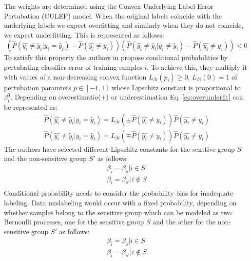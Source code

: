 \documentclass[runningheads]{llncs}
\begin{document}
The weights are determined using the Convex Underlying Label Error Pertubation (CULEP) model. When the original labels coincide with the underlying labels we expect overfitting and similarly when they do not coincide, we expect underfitting. This is represented as follows:
\begin{equation}
(\hat{P}(\hat{y_i} \neq \tilde{y_i} | y_i = \tilde{y_i})-\hat{P}(\hat{y_i} \neq y_i))(\hat{P}(\hat{y_i} \neq \tilde{y_i} | y_i \neq \tilde{y_i})-\hat{P}(\hat{y_i} \neq y_i)) < 0
\label{eq:overunderfit}
\end{equation}
To satisfy this property the authors in \cite{krasanakis2018adaptive} propose conditional probabilities by pertubating classifier error of training samples $i$. To achieve this, they multiply it with values of a non-decreasing convex function $L_{\beta i}(p_i) \geq 0$, $L_{\beta i}(0) = 1$ of pertubation paramters $p \in [-1,1]$ whose Lipschitz constant is proportional to $\beta_i^3$. Depending on overestimatio(+) or underestimation Eq. \ref{eq:overunderfit} can be represented as:
\begin{equation}
\begin{split}
\hat{P}(\hat{y_i} \neq \tilde{y_i} | y_i = \tilde{y_i}) = L_{\beta i}(\pm \hat{P}(\hat{y_i} \neq y_i))\hat{P}(\hat{y_i} \neq y_i) \\
\hat{P}(\hat{y_i} \neq \tilde{y_i} | y_i = \tilde{y_i}) = L_{\beta i}(\mp \hat{P}(\hat{y_i} \neq y_i))\hat{P}(\hat{y_i} \neq y_i) 
\end{split}
\label{eq:lipschitz}
\end{equation}
The authors have selected different Lipschitz constants for the senstive group $S$ and the non-sensitive group $S'$ as follows:
\begin{equation}
\begin{split}
\beta_i = \beta_s | i \in S\\
\beta_i = \beta_{s'} | i \notin S\\
\end{split}
\label{eq:lipschitzconstants}
\end{equation}
Conditional probability needs to consider the probability bias for inadequate labeling. Data mislabeling would occur with a fixed probability, depending on whether samples belong to the sensitive group which can be modeled as two Bernoulli processes, one for the sensitive group $S$ and the other for the non-sensitive group $S'$ as follows:
\begin{equation}
\begin{split}
\beta_i = \beta_s | i \in S\\
\beta_i = \beta_{s'} | i \notin S\\
\end{split}
\label{eq:lipschitzconstants}
\end{equation}
\end{document}
